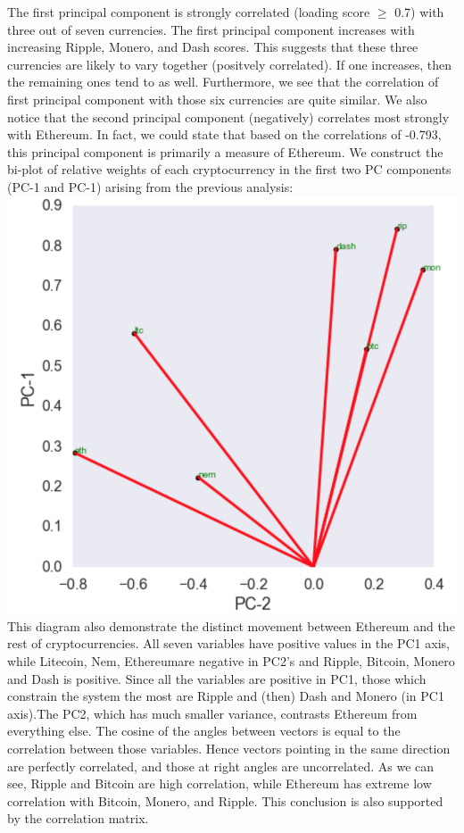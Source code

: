 \documentclass[12pt,twoside]{article}
\begin{document}
\bigbreak
The first principal component is strongly correlated (loading score $\geq$ 0.7) with three out of seven currencies. The first principal component increases with increasing Ripple, Monero, and Dash scores. This suggests that these three currencies are likely to vary together (positvely correlated). If one increases, then the remaining ones tend to as well. Furthermore, we see that the correlation of first principal component with those six currencies are quite similar. \newline
We also notice that the second principal component (negatively) correlates most strongly with Ethereum. In fact, we could state that based on the correlations of -0.793, this principal component is primarily a measure of Ethereum.
\bigbreak
We construct the bi-plot of relative weights of each cryptocurrency in the first two PC components (PC-1 and PC-1) arising from the previous analysis:
\bigbreak
\includegraphics[scale=.6]{biplot1.png}
\bigbreak
This diagram also demonstrate the distinct movement between Ethereum and the rest of cryptocurrencies. All seven variables have positive values in the PC1 axis, while Litecoin, Nem, Ethereumare negative in PC2's and Ripple, Bitcoin, Monero and Dash is positive. Since all the variables are positive in PC1, those which constrain the system the most are Ripple and (then) Dash and Monero (in PC1 axis).The PC2, which has much smaller variance, contrasts Ethereum from everything else.
\bigbreak
The cosine of the angles between vectors is equal to the correlation between those variables. Hence vectors pointing in the same direction are perfectly correlated, and those at right angles are uncorrelated. As we can see, Ripple and Bitcoin are high correlation, while Ethereum has extreme low correlation with Bitcoin, Monero, and Ripple. This conclusion is also supported by the correlation matrix.
\end{document}
